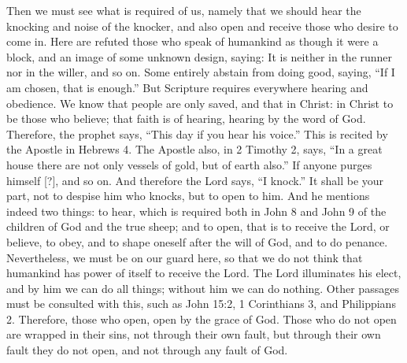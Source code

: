 Then we must see what is required of us, namely that we should hear the knocking and noise of the knocker, and also open and receive those who desire to come in. Here are refuted those who speak of humankind as though it were a block, and an image of some unknown design, saying: It is neither in the runner nor in the willer, and so on. Some entirely abstain from doing good, saying, “If I am chosen, that is enough.” But Scripture requires everywhere hearing and obedience. We know that people are only saved, and that in Christ: in Christ to be those who believe; that faith is of hearing, hearing by the word of God. Therefore, the prophet says, “This day if you hear his voice.” This is recited by the Apostle in Hebrews 4. The Apostle also, in 2 Timothy 2, says, “In a great house there are not only vessels of gold, but of earth also.” If anyone purges himself [?], and so on. And therefore the Lord says, “I knock.” It shall be your part, not to despise him who knocks, but to open to him. And he mentions indeed two things: to hear, which is required both in John 8 and John 9 of the children of God and the true sheep; and to open, that is to receive the Lord, or believe, to obey, and to shape oneself after the will of God, and to do penance. Nevertheless, we must be on our guard here, so that we do not think that humankind has power of itself to receive the Lord. The Lord illuminates his elect, and by him we can do all things; without him we can do nothing. Other passages must be consulted with this, such as John 15:2, 1 Corinthians 3, and Philippians 2. Therefore, those who open, open by the grace of God. Those who do not open are wrapped in their sins, not through their own fault, but through their own fault they do not open, and not through any fault of God.

